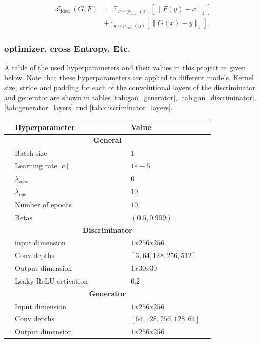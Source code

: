 \documentclass[12pt, fleqn, titlepage]{article}
\begin{document}
\[\begin{aligned}
	\mathcal{L}_{\text {iden }}(G, F) &=\mathbb{E}_{x \sim p_{\text {data }}(x)}\left[\|F(y)-x\|_{1}\right] \\
	&+\mathbb{E}_{y \sim p_{\text {data }}(y)}\left[\|G(x)-y\|_{1}\right] .
\end{aligned}\]


\subsubsection{optimizer, cross Entropy, Etc.}
A table of the used hyperparameters and their values in this project in given below. Note that these hyperparameters are applied to different models. Kernel size, stride and padding for each of the convolutional layers of the discriminator and generator are shown in tables \ref{tab:gan_generator}, \ref{tab:gan_discriminator}, \ref{tab:generator_layers} and \ref{tab:discriminator_layers}.
\begin{table}[H]
	\centering
	\begin{tabular}{l l l l l l l l l}
		\toprule
		& \textbf{Hyperparameter}           &&&&& & \textbf{Value}   & \\ \midrule
		& \multicolumn{7}{c}{\textbf{General}}          & \\
		& Batch size              &&&&& & $1$           & \\
		& Learning rate [$\alpha$]&&&&& & $1e-5$        & \\
		& $\lambda_{iden}$        &&&&& & $0$           & \\
		& $\lambda_{cyc}$         &&&&& & $10$          & \\
		& Number of epochs        &&&&& & $10$          & \\
		& Betas                   &&&&& & $(0.5, 0.999)$& \\
		& \multicolumn{7}{c}{\textbf{Discriminator}}    & \\
		& input dimension         &&&&& & $1x256x256$   & \\
		& Conv depths             &&&&& & $\left[3, 64, 128, 256, 512\right]$& \\
		& Output dimension        &&&&& & $1x30x30$     & \\
		& Leaky-ReLU activation   &&&&& & $0.2$         & \\
		& \multicolumn{7}{c}{\textbf{Generator}}        & \\
		& Input dimension         &&&&& & $1x256x256$   & \\
		& Conv depths             &&&&& & $\left[64, 128, 256, 128, 64\right]$              & \\
		& Output dimension        &&&&& & $1x256x256$   & \\ \bottomrule
	\end{tabular}
\end{table} 
\end{document}
